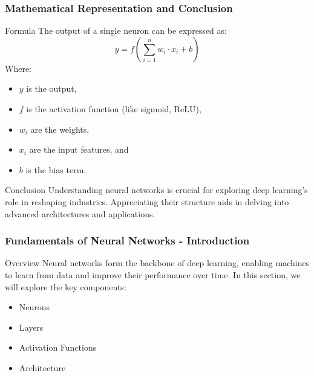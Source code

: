 \documentclass[aspectratio=169]{beamer}
\begin{document}
\begin{frame}[fragile]
    \frametitle{Mathematical Representation and Conclusion}
    \begin{block}{Formula}
        The output of a single neuron can be expressed as:
        \begin{equation}
        y = f\left( \sum_{i=1}^{n} w_i \cdot x_i + b \right)
        \end{equation}
        Where:
        \begin{itemize}
            \item \(y\) is the output,
            \item \(f\) is the activation function (like sigmoid, ReLU),
            \item \(w_i\) are the weights,
            \item \(x_i\) are the input features, and
            \item \(b\) is the bias term.
        \end{itemize}
    \end{block}
    
    \begin{block}{Conclusion}
        Understanding neural networks is crucial for exploring deep learning's role in reshaping industries. Appreciating their structure aids in delving into advanced architectures and applications.
    \end{block}
\end{frame}

\begin{frame}[fragile]
    \frametitle{Fundamentals of Neural Networks - Introduction}
    \begin{block}{Overview}
        Neural networks form the backbone of deep learning, enabling machines to learn from data and improve their performance over time. In this section, we will explore the key components:
    \end{block}
    \begin{itemize}
        \item Neurons
        \item Layers
        \item Activation Functions
        \item Architecture
    \end{itemize}
\end{frame}
\end{document}
